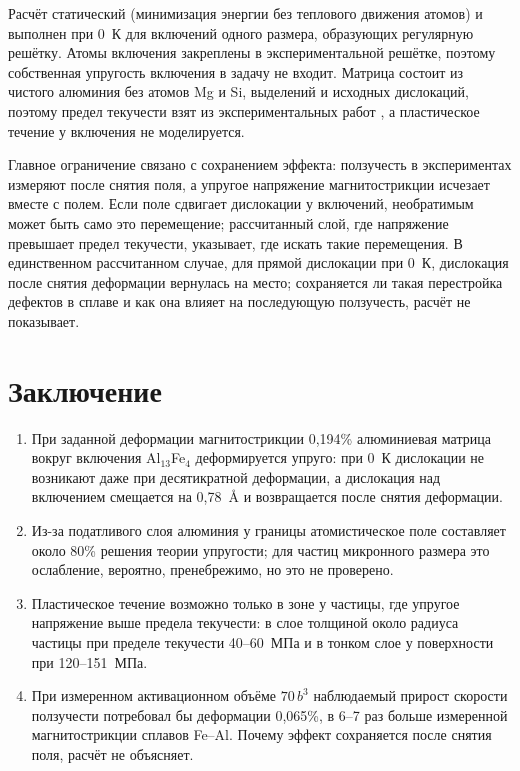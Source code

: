 \documentclass[11pt,a4paper]{article}
\begin{document}
Расчёт статический (минимизация энергии без теплового движения атомов)
и выполнен при 0~К для включений одного размера, образующих регулярную
решётку. Атомы включения закреплены в экспериментальной решётке, поэтому
собственная упругость включения в задачу не входит. Матрица состоит из
чистого алюминия без атомов Mg и Si, выделений и исходных дислокаций,
поэтому предел текучести взят из экспериментальных работ
\cite{Friha2024JMMM,Skvortsov2019JAP,Pshonkin2025ZL}, а пластическое
течение у включения не моделируется.

Главное ограничение связано с сохранением эффекта: ползучесть в экспериментах
измеряют после снятия поля, а упругое напряжение магнитострикции
исчезает вместе с полем. Если поле сдвигает дислокации у включений,
необратимым может быть само это перемещение; рассчитанный слой, где
напряжение превышает предел текучести, указывает, где искать такие
перемещения.
В единственном рассчитанном случае, для прямой дислокации при 0~К,
дислокация после снятия деформации вернулась на место; сохраняется ли
такая перестройка дефектов в сплаве и как она влияет на последующую
ползучесть, расчёт не показывает.

\section{Заключение}

\begin{enumerate}
\item При заданной деформации магнитострикции 0{,}194\% алюминиевая
матрица вокруг включения Al$_{13}$Fe$_4$ деформируется упруго: при 0~К
дислокации не возникают даже при десятикратной деформации, а дислокация
над включением смещается на 0{,}78~\AA{} и возвращается после снятия
деформации.
\item Из-за податливого слоя алюминия у границы атомистическое поле
составляет около 80\% решения теории упругости; для частиц
микронного размера это ослабление, вероятно, пренебрежимо, но это не
проверено.
\item Пластическое течение возможно только в зоне у частицы, где
упругое напряжение выше предела текучести: в слое толщиной около радиуса
частицы при пределе текучести 40--60~МПа и в тонком слое у поверхности
при 120--151~МПа.
\item При измеренном активационном объёме $70\,b^3$ наблюдаемый прирост
скорости ползучести потребовал бы деформации 0{,}065\%, в 6--7 раз
больше измеренной магнитострикции сплавов Fe--Al. Почему эффект
сохраняется после снятия поля, расчёт не объясняет.
\end{enumerate}
\end{document}
